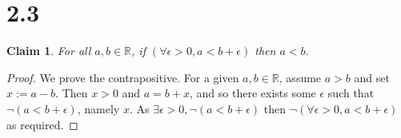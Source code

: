 \documentclass{article}
\theoremstyle{plain}
\newtheorem*{claim}{Claim}
\begin{document}
\section*{2.3}

\begin{claim}
    For all $a,b \in \mathbb{R}$, if $(\forall \epsilon > 0, a < b + \epsilon)$ then $a < b$.
\end{claim}

\begin{proof}
    We prove the contrapositive. For a given $a,b \in \mathbb{R}$, assume $a > b$ and set $x := a - b$. Then $x > 0$ and $a = b + x$, and so there exists some $\epsilon$ such that $\neg (a < b + \epsilon)$, namely $x$. As $\exists \epsilon > 0, \neg (a < b + \epsilon)$ then $\neg (\forall \epsilon > 0, a < b + \epsilon)$ as required.
\end{proof}
\end{document}
